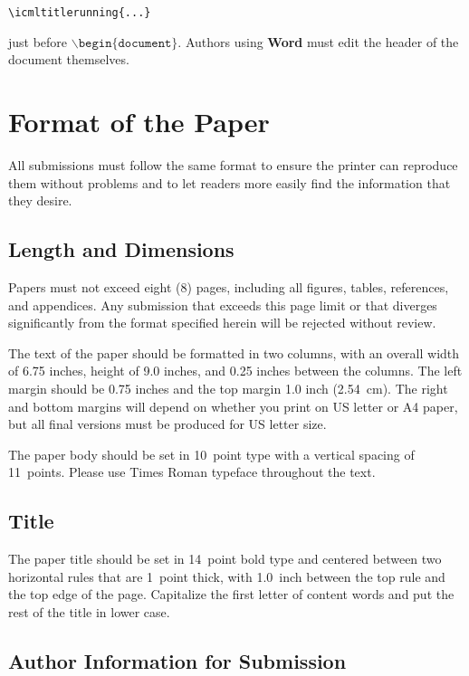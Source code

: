 \documentclass{article}
\begin{document}
\verb|\icmltitlerunning{...}|

just before $\mathtt{\backslash begin\{document\}}$.
Authors using \textbf{Word} must edit the header of the document themselves.

\section{Format of the Paper} 
 
All submissions must follow the same format to ensure the printer can
reproduce them without problems and to let readers more easily find
the information that they desire.

\subsection{Length and Dimensions}

Papers must not exceed eight (8) pages, including all figures, tables,
references, and appendices. Any submission that exceeds this page
limit or that diverges significantly from the format specified herein
will be rejected without review.

The text of the paper should be formatted in two columns, with an
overall width of 6.75 inches, height of 9.0 inches, and 0.25 inches
between the columns. The left margin should be 0.75 inches and the top
margin 1.0 inch (2.54~cm). The right and bottom margins will depend on
whether you print on US letter or A4 paper, but all final versions
must be produced for US letter size.

The paper body should be set in 10~point type with a vertical spacing
of 11~points. Please use Times Roman typeface throughout the text.

\subsection{Title}

The paper title should be set in 14~point bold type and centered
between two horizontal rules that are 1~point thick, with 1.0~inch
between the top rule and the top edge of the page. Capitalize the
first letter of content words and put the rest of the title in lower
case.

\subsection{Author Information for Submission}
\label{author info}
\end{document}
